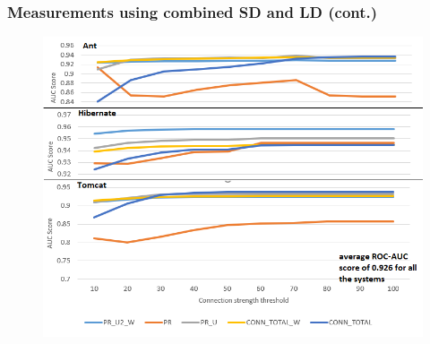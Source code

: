 \documentclass{beamer}
\begin{document}
 \begin{frame}
\frametitle{Measurements using combined SD and LD (cont.)}
 \begin{center}
     \begin{figure}
	\includegraphics[width=\textwidth]{ld_st_measurements.png}
     \end{figure}
\end{center}

\end{frame}


\end{document}
